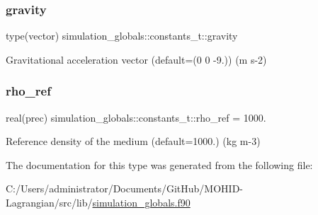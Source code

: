 \subsubsection{\texorpdfstring{gravity}{gravity}}
{\footnotesize\ttfamily type(vector) simulation\+\_\+globals\+::constants\+\_\+t\+::gravity\hspace{0.3cm}{\ttfamily [private]}}



Gravitational acceleration vector (default=(0 0 -\/9.)) (m s-\/2) 

\mbox{\label{structsimulation__globals_1_1constants__t_af9496305e46cea74e54758362274a701}} 
\subsubsection{\texorpdfstring{rho\+\_\+ref}{rho\_ref}}
{\footnotesize\ttfamily real(prec) simulation\+\_\+globals\+::constants\+\_\+t\+::rho\+\_\+ref = 1000.\hspace{0.3cm}{\ttfamily [private]}}



Reference density of the medium (default=1000.) (kg m-\/3) 



The documentation for this type was generated from the following file\+:\begin{DoxyCompactItemize}
\item 
C\+:/\+Users/administrator/\+Documents/\+Git\+Hub/\+M\+O\+H\+I\+D-\/\+Lagrangian/src/lib/\hyperlink{simulation__globals_8f90}{simulation\+\_\+globals.\+f90}\end{DoxyCompactItemize}
